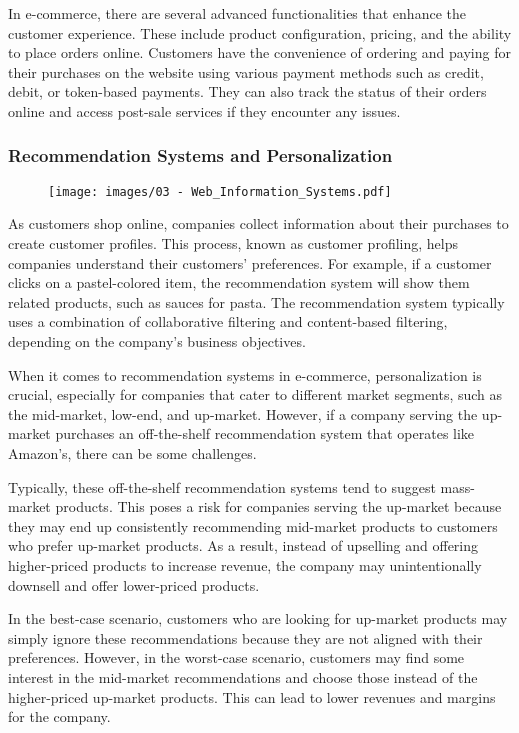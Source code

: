 In e-commerce, there are several advanced functionalities that enhance
the customer experience. These include product configuration, pricing,
and the ability to place orders online. Customers have the convenience
of ordering and paying for their purchases on the website using various
payment methods such as credit, debit, or token-based payments. They can
also track the status of their orders online and access post-sale
services if they encounter any issues.

\subsubsection{Recommendation Systems and
  Personalization}\label{recommendation-systems-and-personalization}

\begin{figure}[!h]
  \centering
  \texttt{[image: images/03 - Web\_Information\_Systems.pdf]}
\end{figure}

As customers shop online, companies collect information about their
purchases to create customer profiles. This process, known as customer
profiling, helps companies understand their customers' preferences. For
example, if a customer clicks on a pastel-colored item, the
recommendation system will show them related products, such as sauces
for pasta. The recommendation system typically uses a combination of
collaborative filtering and content-based filtering, depending on the
company's business objectives.

When it comes to recommendation systems in e-commerce, personalization
is crucial, especially for companies that cater to different market
segments, such as the mid-market, low-end, and up-market. However, if a
company serving the up-market purchases an off-the-shelf recommendation
system that operates like Amazon's, there can be some challenges.

Typically, these off-the-shelf recommendation systems tend to suggest
mass-market products. This poses a risk for companies serving the
up-market because they may end up consistently recommending mid-market
products to customers who prefer up-market products. As a result,
instead of upselling and offering higher-priced products to increase
revenue, the company may unintentionally downsell and offer lower-priced
products.

In the best-case scenario, customers who are looking for up-market
products may simply ignore these recommendations because they are not
aligned with their preferences. However, in the worst-case scenario,
customers may find some interest in the mid-market recommendations and
choose those instead of the higher-priced up-market products. This can
lead to lower revenues and margins for the company.

